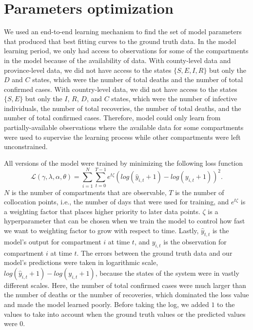 \section{Parameters optimization}
\label{sec:methodologies-parameters-fitting}

We used an end-to-end learning mechanism to find the set of model parameters that produced that best fitting curves to the ground truth data.
In the model learning period, we only had access to observations for some of the compartments in the model because of the availability of data.
With county-level data and province-level data, we did not have access to the states $\{S, E, I, R\}$ but only the $D$ and $C$ states, which were the number of total deaths and the number of total confirmed cases.
With country-level data, we did not have access to the states $\{S, E\}$ but only the $I$, $R$, $D$, and $C$ states, which were the number of infective individuals, the number of total recoveries, the number of total deaths, and the number of total confirmed cases.
Therefore, model could only learn from partially-available observations where the available data for some compartments were used to supervise the learning process while other compartments were left unconstrained.

All versions of the model were trained by minimizing the following loss function
\begin{equation}
    \mathcal{L}(\gamma, \lambda, \alpha, \theta) = \sum_{i=1}^N \sum_{t=0}^{T-1} e^{t\zeta} (log(\hat{y}_{i,t} + 1) - log(y_{i,t} + 1))^2.
    \label{eq:ude-model-loss}
\end{equation}
$N$ is the number of compartments that are observable, $T$ is the number of collocation points, i.e., the number of days that were used for training, and $e^{t\zeta}$ is a weighting factor that places higher priority to later data points.
$\zeta$ is a hyperparameter that can be chosen when we train the model to control how fast we want to weighting factor to grow with respect to time.
Lastly, $\hat{y}_{t,t}$ is the model's output for compartment $i$ at time $t$, and $y_{i,t}$ is the observation for compartment $i$ at time $t$.
The errors between the ground truth data and our model's predictions were taken in logarithmic scale, $log(\hat{y}_{i,t} + 1) - log(y_{i,t} + 1)$, because the states of the system were in vastly different scales.
Here, the number of total confirmed cases were much larger than the number of deaths or the number of recoveries, which dominated the loss value and made the model learned poorly.
Before taking the log, we added $1$ to the values to take into account when the ground truth values or the predicted values were $0$.

